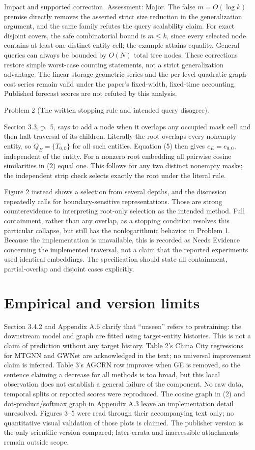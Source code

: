 \documentclass[10pt]{article}
\begin{document}
Impact and supported correction. Assessment: Major. The false \(m=O(\log k)\) premise directly removes the asserted strict size reduction in the generalization argument, and the same family refutes the query scalability claim. For exact disjoint covers, the safe combinatorial bound is \(m\leq k\), since every selected node contains at least one distinct entity cell; the example attains equality. General queries can always be bounded by \(O(N)\) total tree nodes. These corrections restore simple worst-case counting statements, not a strict generalization advantage. The linear storage geometric series and the per-level quadratic graph-cost series remain valid under the paper’s fixed-width, fixed-time accounting. Published forecast scores are not refuted by this analysis.\par
Problem 2 (The written stopping rule and intended query disagree).\par
Section 3.3, p. 5, says to add a node when it overlaps any occupied mask cell and then halt traversal of its children. Literally the root overlaps every nonempty entity, so \(Q_E=\{T_{0,0}\}\) for all such entities. Equation (5) then gives \(e_E=e_{0,0}\), independent of the entity. For a nonzero root embedding all pairwise cosine similarities in (2) equal one. This follows for any two distinct nonempty masks; the independent strip check selects exactly the root under the literal rule.\par
Figure 2 instead shows a selection from several depths, and the discussion repeatedly calls for boundary-sensitive representations. Those are strong counterevidence to interpreting root-only selection as the intended method. Full containment, rather than any overlap, as a stopping condition resolves this particular collapse, but still has the nonlogarithmic behavior in Problem 1. Because the implementation is unavailable, this is recorded as Needs Evidence concerning the implemented traversal, not a claim that the reported experiments used identical embeddings. The specification should state all containment, partial-overlap and disjoint cases explicitly.\par
\section*{Empirical and version limits}
Section 3.4.2 and Appendix A.6 clarify that “unseen” refers to pretraining: the downstream model and graph are fitted using target-entity histories. This is not a claim of prediction without any target history. Table 2’s China City regressions for MTGNN and GWNet are acknowledged in the text; no universal improvement claim is inferred. Table 3’s AGCRN row improves when GE is removed, so the sentence claiming a decrease for all methods is too broad, but this local observation does not establish a general failure of the component. No raw data, temporal splits or reported scores were reproduced. The cosine graph in (2) and dot-product/softmax graph in Appendix A.3 leave an implementation detail unresolved. Figures 3–5 were read through their accompanying text only; no quantitative visual validation of those plots is claimed. The publisher version is the only scientific version compared; later errata and inaccessible attachments remain outside scope.\par
\end{document}
